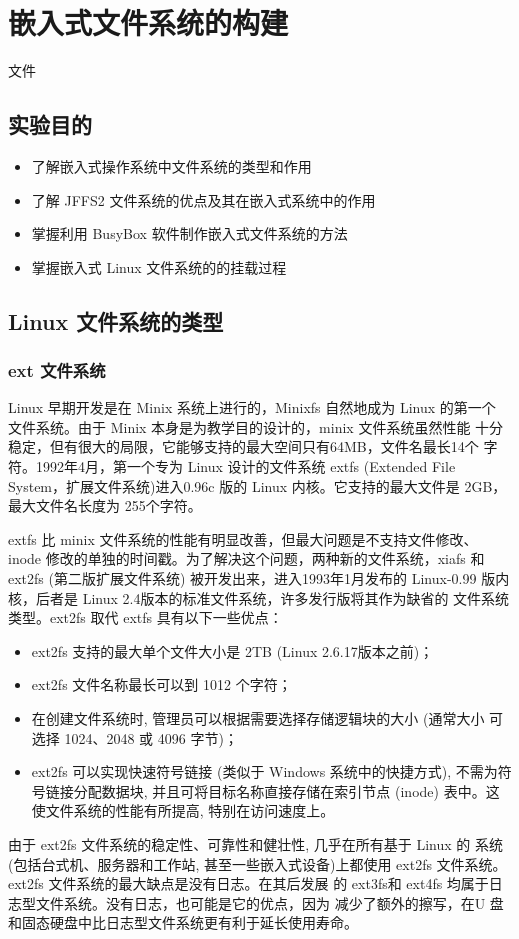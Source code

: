 \chapter{嵌入式文件系统的构建}{文件}\label{ch-fs}

\section{实验目的}
\begin{itemize}
  \item 了解嵌入式操作系统中文件系统的类型和作用
  \item 了解 JFFS2 文件系统的优点及其在嵌入式系统中的作用
  \item 掌握利用 BusyBox 软件制作嵌入式文件系统的方法
  \item 掌握嵌入式 Linux 文件系统的的挂载过程
\end{itemize}

\section{Linux 文件系统的类型}
\subsection{ext 文件系统}
Linux 早期开发是在 Minix 系统上进行的，Minixfs 自然地成为 Linux 的第一个
文件系统。由于 Minix 本身是为教学目的设计的，minix 文件系统虽然性能
十分稳定，但有很大的局限，它能够支持的最大空间只有64MB，文件名最长14个
字符。1992年4月，第一个专为 Linux 设计的文件系统 extfs (Extended
File System，扩展文件系统)进入0.96c 版的 Linux 内核。它支持的最大文件是
2GB，最大文件名长度为 255个字符。

extfs 比 minix 文件系统的性能有明显改善，但最大问题是不支持文件修改、
inode 修改的单独的时间戳。为了解决这个问题，两种新的文件系统，xiafs 和
ext2fs (第二版扩展文件系统) 被开发出来，进入1993年1月发布的 Linux-0.99
版内核，后者是 Linux 2.4版本的标准文件系统，许多发行版将其作为缺省的
文件系统类型。ext2fs 取代 extfs 具有以下一些优点：
\begin{itemize}
    \item ext2fs 支持的最大单个文件大小是 2TB (Linux 2.6.17版本之前)；
    \item ext2fs 文件名称最长可以到 1012 个字符；
    \item 在创建文件系统时, 管理员可以根据需要选择存储逻辑块的大小 (通常大小
        可选择 1024、2048 或 4096 字节)；
    \item ext2fs 可以实现快速符号链接 (类似于 Windows 系统中的快捷方式), 
        不需为符号链接分配数据块, 并且可将目标名称直接存储在索引节点 (inode)
        表中。这使文件系统的性能有所提高, 特别在访问速度上。
\end{itemize}
由于 ext2fs 文件系统的稳定性、可靠性和健壮性, 几乎在所有基于 Linux 的
系统 (包括台式机、服务器和工作站, 甚至一些嵌入式设备)上都使用 ext2fs 
文件系统。ext2fs 文件系统的最大缺点是没有日志。在其后发展
的 ext3fs和 ext4fs 均属于日志型文件系统。没有日志，也可能是它的优点，因为
减少了额外的擦写，在U 盘和固态硬盘中比日志型文件系统更有利于延长使用寿命。


